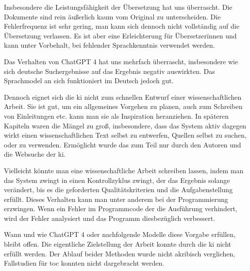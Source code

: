 
Insbesondere die Leistungsfähigkeit der Übersetzung hat uns überrascht. Die Dokumente sind rein äußerlich kaum vom Original zu unterscheiden. Die Fehlerfrequenz ist sehr gering, man kann sich dennoch nicht vollständig auf die Übersetzung verlassen. Es ist aber eine Erleichterung für Übersetzerïnnen und kann unter Vorbehalt, bei fehlender Sprachkenntnis verwendet werden.

Das Verhalten von ChatGPT 4 hat uns mehrfach überrascht, insbesondere wie sich deutsche Suchergebnisse auf das Ergebnis negativ auswirkten. Das Sprachmodel an sich funktioniert im Deutsch jedoch gut.

Dennoch eignet sich die \gls{ki} nicht zum schnellen Entwurf einer wissenschaftlichen Arbeit. Sie ist gut, um ein allgemeines Vorgehen zu planen, auch zum Schreiben von Einleitungen etc. kann man sie als Inspiration heranziehen. In späteren Kapiteln waren die Mängel zu groß, insbesondere, dass das System aktiv dagegen wirkt einen wissenschaftlichen Text selbst zu entwerfen, Quellen selbst zu suchen, oder zu verwenden. Ermöglicht wurde das zum Teil nur durch den Autoren und die Websuche der \gls{ki}.

Vielleicht könnte man eine wissenschaftliche Arbeit schreiben lassen, indem man das System zwingt in einen Kontrollzyklus zwingt, der das Ergebnis solange verändert, bis es die geforderten Qualitätskriterien und die Aufgabenstellung erfüllt. Dieses Verhalten kann man unter anderem bei der Programmierung erzwingen. Wenn ein Fehler im Programmcode der  die Ausführung verhindert, wird der Fehler analysiert und das Programm diesbezüglich verbessert.

Wann und wie ChatGPT 4 oder nachfolgende Modelle diese Vorgabe erfüllen, bleibt offen. Die eigentliche Zielstellung der Arbeit konnte durch die \gls{ki} nicht erfüllt werden. Der Ablauf beider Methoden wurde nicht akribisch verglichen, Fallstudien für \gls{toc} konnten nicht dargebracht werden.